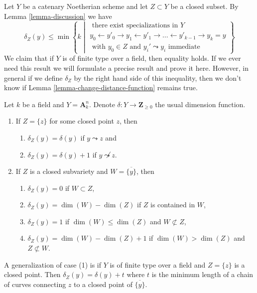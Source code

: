 \begin{remark}
\label{remark-discussion}
Let $Y$ be a catenary Noetherian scheme and let $Z \subset Y$
be a closed subset. By Lemma \ref{lemma-discussion} we have
$$
\delta_Z(y) \leq \min
\left\{ k \middle|
\begin{matrix}
\text{ there exist specializations in }Y \\
y_0 \leftarrow y'_0 \rightarrow y_1 \leftarrow y'_1 \rightarrow \ldots
\leftarrow y'_{k - 1} \rightarrow y_k = y \\
\text{ with }y_0 \in Z\text{ and }y_i' \leadsto y_i
\text{ immediate}
\end{matrix}
\right\}
$$
We claim that if $Y$ is of finite type over a field,
then equality holds. If we ever need this result we
will formulate a precise result and prove it here.
However, in general if we define $\delta_Z$
by the right hand side of this inequality, then we don't
know if Lemma \ref{lemma-change-distance-function} remains true.
\end{remark}

\begin{example}
\label{example-distance}
Let $k$ be a field and $Y = \mathbf{A}^n_k$. Denote
$\delta : Y \to \mathbf{Z}_{\geq 0}$ the usual dimension function.
\begin{enumerate}
\item If $Z = \{z\}$ for some closed point $z$, then
\begin{enumerate}
\item $\delta_Z(y) = \delta(y)$ if $y \leadsto z$ and
\item $\delta_Z(y) = \delta(y) + 1$ if $y \not \leadsto z$.
\end{enumerate}
\item If $Z$ is a closed subvariety and $W = \overline{\{y\}}$, then
\begin{enumerate}
\item $\delta_Z(y) = 0$ if $W \subset Z$,
\item $\delta_Z(y) = \dim(W) - \dim(Z)$ if $Z$ is contained in $W$,
\item $\delta_Z(y) = 1$ if $\dim(W) \leq \dim(Z)$ and $W \not \subset Z$,
\item $\delta_Z(y) = \dim(W) - \dim(Z) + 1$ if $\dim(W) > \dim(Z)$
and $Z \not \subset W$.
\end{enumerate}
\end{enumerate}
A generalization of case (1) is if $Y$ is of finite type over a field
and $Z = \{z\}$ is a closed point. Then $\delta_Z(y) = \delta(y) + t$
where $t$ is the minimum length of a chain of curves connecting
$z$ to a closed point of $\overline{\{y\}}$.
\end{example}







